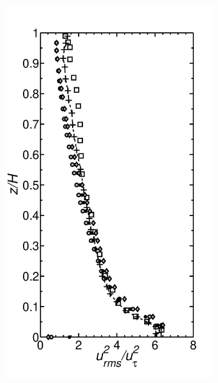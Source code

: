 \documentclass[times]{fldauth}
\begin{document}
\begin{figure}
\centering
        \begin{subfigure}[t]{0.29\textwidth}
                \includegraphics[width=\linewidth]{Fig3/urms_filter_paper.pdf}
                \caption{}
                \label{fig:urms}
        \end{subfigure}%
        \centering
        \begin{subfigure}[t]{0.29\textwidth}

\end{subfigure}
\end{figure}
\end{document}
